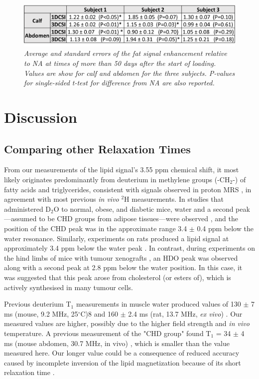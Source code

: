 \begin{figure}
    \centering
    \includegraphics[width=1\textwidth]{Figures/Lipid/Lipid_Table.png}
    \caption{\textit{Average and standard errors of the fat signal enhancement relative to \ac{NA} at times of more than 50 days after the start of loading. Values are show for calf and abdomen for the three subjects. P-values for single-sided t-test for difference from \ac{NA} are also reported.}}
    \label{fig:Lip:Amp_Table}
\end{figure}

\section{Discussion}

\subsection{Comparing other Relaxation Times}

From our measurements of the lipid signal’s 3.55 ppm chemical shift, it most likely originates predominantly from deuterium in methylene groups (-CH$_2$-) of fatty acids and triglycerides, consistent with signals observed in proton \ac{MRS} \cite{Ren2008CompositionTesla}, in agreement with most previous \textit{in vivo} $^2$H measurements. In studies that administered D$_2$O to normal, obese, and diabetic mice, water and a second peak—assumed to be CHD groups from adipose tissues—were observed \cite{Brereton1986PreliminarySpectroscopy, Brereton1989TheMice}, and the position of the CHD peak was in the approximate range 3.4 $\pm$ 0.4 ppm below the water resonance. Similarly, experiments on rats produced a lipid signal at approximately 3.4 ppm below the water peak \cite{Kosenkov2018TheMice}. In contrast, during experiments on the hind limbs of mice with tumour xenografts \cite{Assmann2020InCholesterol}, an \ac{HDO} peak was observed along with a second peak at 2.8 ppm below the water position. In this case, it was suggested \cite{Assmann2020InCholesterol} that this peak arose from cholesterol (or esters of), which is actively synthesised in many tumour cells.

Previous deuterium T$_1$ measurements in muscle water produced values of 130 $\pm$ 7 ms (mouse, 9.2 MHz, 25$^\circ$C)8 and 160 $\pm$ 2.4 ms (rat, 13.7 MHz, \textit{ex vivo}) \cite{Block1987COMMUNICATIONSTissues}. Our measured values are higher, possibly due to the higher field strength and \textit{in vivo} temperature. A previous measurement of the "CHD group" found T$_1$ = 34 $\pm$ 4 ms (mouse abdomen, 30.7 MHz, in vivo) \cite{Brereton1986PreliminarySpectroscopy}, which is smaller than the value measured here. Our longer value could be a consequence of reduced accuracy caused by incomplete inversion of the lipid magnetization because of its short relaxation time \cite{Pfaff2017PredictingPulses}.

